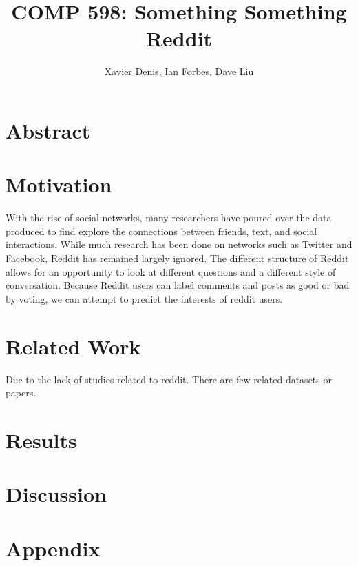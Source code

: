 \documentclass[11pt,twocolumn]{article}
\title {COMP 598: Something Something Reddit}
\author {Xavier Denis, Ian Forbes, Dave Liu}
\begin{document}
\maketitle

\section {Abstract}

\section {Motivation}
With the rise of social networks, many researchers have poured over the data produced to find explore the connections between friends, text, and social interactions. While much research has been done on networks such as Twitter and Facebook, Reddit has remained largely ignored. The different structure of Reddit allows for an opportunity to look at different questions and a different style of conversation. Because Reddit users can label comments and posts as good or bad by voting, we can attempt to predict the interests of reddit users. 
\section {Related Work}
Due to the lack of studies related to reddit. There are few related datasets or papers. 

\section {Results}

\section {Discussion}

\section {Appendix}
\end{document}
